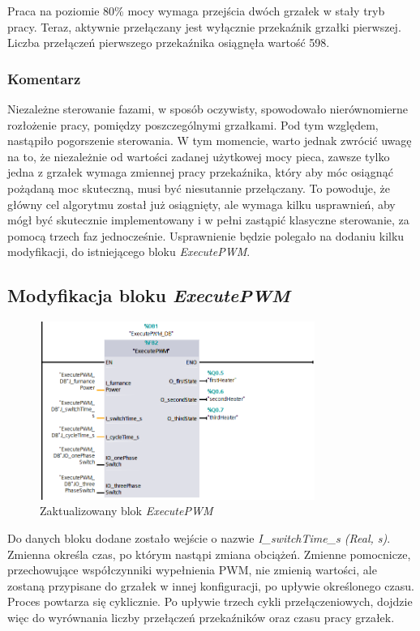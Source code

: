 \documentclass[a4paper,twoside,12pt]{book}
\begin{document}
\noindent Praca na poziomie 80\% mocy wymaga przejścia dwóch grzałek w stały tryb pracy. Teraz, aktywnie przełączany jest wyłącznie przekaźnik grzałki pierwszej. Liczba przełączeń pierwszego przekaźnika osiągnęła wartość 598.

\subsubsection{Komentarz}
Niezależne sterowanie fazami, w sposób oczywisty, spowodowało nierównomierne rozłożenie pracy, pomiędzy poszczególnymi grzałkami. Pod tym względem, nastąpiło pogorszenie sterowania. W tym momencie, warto jednak zwrócić uwagę na to, że niezależnie od wartości zadanej użytkowej mocy pieca, zawsze tylko jedna z grzałek wymaga zmiennej pracy przekaźnika, który aby móc osiągnąć pożądaną moc skuteczną, musi być niesutannie przełączany. To powoduje, że główny cel algorytmu został już osiągnięty, ale wymaga kilku usprawnień, aby mógł być skutecznie implementowany i w pełni zastąpić klasyczne sterowanie, za pomocą trzech faz jednocześnie. Usprawnienie będzie polegało na dodaniu kilku modyfikacji, do istniejącego bloku \textit{ExecutePWM}.

\subsection{Modyfikacja bloku \textit{ExecutePWM}}

\begin{figure}[h]
	\centering
	\includegraphics[width=0.8\textwidth]{./img/executePWMupdate.png}
	\caption{Zaktualizowany blok \textit{ExecutePWM}}
	\label{fig:ExecutePWM ulepszony}
\end{figure}

Do danych bloku dodane zostało wejście o nazwie \textit{I\_switchTime\_s (Real, s)}. Zmienna określa czas, po którym nastąpi zmiana obciążeń. Zmienne pomocnicze, przechowujące współczynniki wypełnienia PWM, nie zmienią wartości, ale zostaną przypisane do grzałek w innej konfiguracji, po upływie określonego czasu. Proces powtarza się cyklicznie. Po upływie trzech cykli przełączeniowych, dojdzie więc do wyrównania liczby przełączeń przekaźników oraz czasu pracy grzałek.
\end{document}
